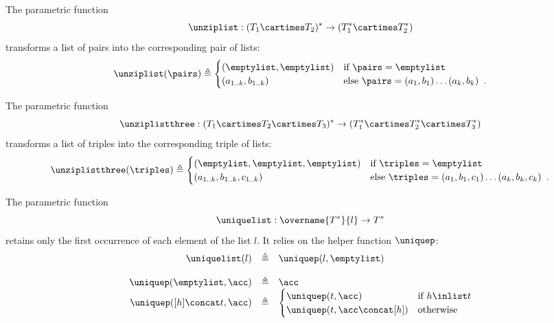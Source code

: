 \hypertarget{def-unziplist}{}
\begin{definition}
The parametric function
\[
\unziplist : (T_1 \cartimes T_2)^* \rightarrow (T_1^* \cartimes T_2^*)
\]
transforms a list of pairs into the corresponding pair of lists:
\[
  \unziplist(\pairs) \triangleq \begin{cases}
    (\emptylist, \emptylist)  & \text{if }\pairs = \emptylist\\
    (a_{1..k}, b_{1..k})      & \text{else }\pairs = (a_1,b_1) \ldots (a_k,b_k)  \enspace.
  \end{cases}
\]
\end{definition}

\hypertarget{def-unziplistthree}{}
\begin{definition}
The parametric function
\[
\unziplistthree : (T_1 \cartimes T_2 \cartimes T_3)^* \rightarrow (T_1^* \cartimes T_2^* \cartimes T_3^*)
\]
transforms a list of triples into the corresponding triple of lists:
\[
  \unziplistthree(\triples) \triangleq \begin{cases}
    (\emptylist, \emptylist, \emptylist)  & \text{if }\triples = \emptylist\\
    (a_{1..k}, b_{1..k}, c_{1..k})      & \text{else }\triples = (a_1,b_1,c_1) \ldots (a_k,b_k,c_k)  \enspace.
  \end{cases}
\]
\end{definition}

\hypertarget{def-uniquelist}{}
\hypertarget{def-uniquep}{}
\begin{definition}
The parametric function
\[
\uniquelist : \overname{T^*}{l} \rightarrow T^*
\]
retains only the first occurrence of each element of the list $l$.
It relies on the helper function $\uniquep$:
\[
\begin{array}{rcl}
\uniquelist(l) &\triangleq& \uniquep(l, \emptylist)\\\\
\uniquep(\emptylist, \acc) &\triangleq& \acc\\
\uniquep([h] \concat t, \acc) &\triangleq&
  \begin{cases}
    \uniquep(t, \acc) & \text{if }h \inlist t\\
    \uniquep(t, \acc \concat [h]) & \text{otherwise}\\
  \end{cases}
\end{array}
\]
\end{definition}

